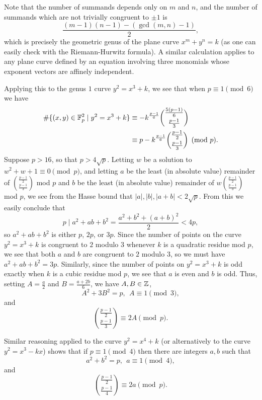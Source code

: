 \documentclass[letterpaper,11pt]{article}
\begin{document}
Note that the number of summands depends only on $m$ and $n$, and the number of summands which are not trivially congruent to $\pm 1$ is 
\[
\frac{(m-1)(n-1)-(\gcd(m,n)-1)}{2},
\]
which is precisely the geometric genus of the plane curve $x^m + y^n = k$ (as one can easily check with the Riemann-Hurwitz formula). A similar calculation applies to any plane curve defined by an equation involving three monomials whose exponent vectors are affinely independent.

\begin{ex} Applying this to the genus $1$ curve $y^2 = x^3 + k$, we see that when $p \equiv 1 \pmod{6}$ we have
\begin{align*}
\#\{(x,y) \in \mathbb{F}_p^2\mid y^2 = x^3 + k\} &\equiv - k^{\frac{p-1}{6}}\binom{\tfrac{5(p-1)}{6}}{\tfrac{p-1}{3}}\\
&\equiv p - k^{\frac{p-1}{6}}\binom{\tfrac{p-1}{2}}{\tfrac{p-1}{3}} \pmod{p}.
\end{align*}
Suppose $p > 16$, so that $p > 4\sqrt{p}$. Letting $w$ be a solution to $w^2+w+1 \equiv 0 \pmod{p}$, and letting $a$ be the least (in absolute value) remainder of $\binom{\tfrac{p-1}{2}}{\tfrac{p-1}{3}}$ mod $p$ and $b$ be the least (in absolute value) remainder of $w\binom{\tfrac{p-1}{2}}{\tfrac{p-1}{3}}$ mod $p$, we see from the Hasse bound that $|a|, |b|, |a+b| < 2\sqrt{p}$. From this we easily conclude that
\[
p \mid a^2 + ab + b^2 = \frac{a^2 + b^2 + (a+b)^2}{2} < 4p,
\]
so $a^2 + ab + b^2$ is either $p$, $2p$, or $3p$. Since the number of points on the curve $y^2 = x^3 + k$ is congruent to $2$ modulo $3$ whenever $k$ is a quadratic residue mod $p$, we see that both $a$ and $b$ are congruent to $2$ modulo $3$, so we must have $a^2 + ab + b^2 = 3p$. Similarly, since the number of points on $y^2 = x^3 + k$ is odd exactly when $k$ is a cubic residue mod $p$, we see that $a$ is even and $b$ is odd. Thus, setting $A = \frac{a}{2}$ and $B = \frac{a+2b}{6}$, we have $A,B \in \mathbb{Z}$,
\[
A^2 + 3B^2 = p,\ \ A \equiv 1 \pmod{3},
\]
and
\[
\binom{\tfrac{p-1}{2}}{\tfrac{p-1}{3}} \equiv 2A \pmod{p}.
\]
\end{ex}

\begin{ex} Similar reasoning applied to the curve $y^2 = x^4 + k$ (or alternatively to the curve $y^2 = x^3 - kx$) shows that if $p \equiv 1 \pmod{4}$ then there are integers $a,b$ such that
\[
a^2 + b^2 = p,\ \ a \equiv 1 \pmod{4},
\]
and
\[
\binom{\tfrac{p-1}{2}}{\tfrac{p-1}{4}} \equiv 2a \pmod{p}.
\]
\end{ex}
\end{document}
